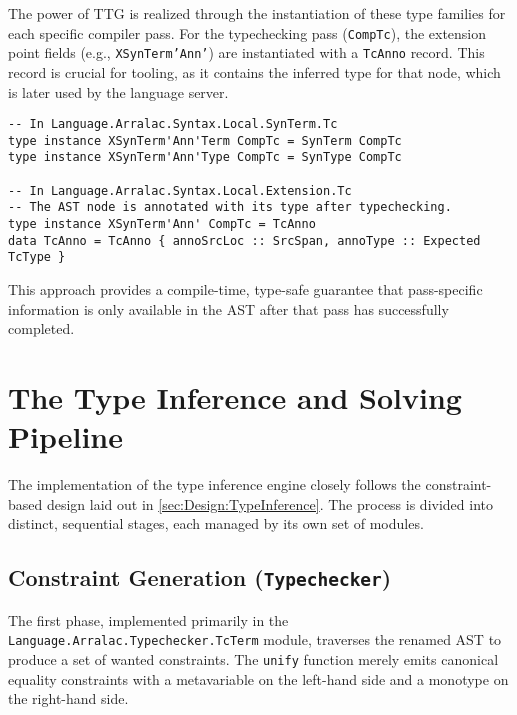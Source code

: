 The power of TTG is realized through the instantiation of these type families for each specific compiler pass. For the typechecking pass (\texttt{CompTc}), the extension point fields (e.g., \texttt{XSynTerm'Ann'}) are instantiated with a \texttt{TcAnno} record. This record is crucial for tooling, as it contains the inferred type for that node, which is later used by the language server.

\begin{verbatim}
-- In Language.Arralac.Syntax.Local.SynTerm.Tc
type instance XSynTerm'Ann'Term CompTc = SynTerm CompTc
type instance XSynTerm'Ann'Type CompTc = SynType CompTc

-- In Language.Arralac.Syntax.Local.Extension.Tc
-- The AST node is annotated with its type after typechecking.
type instance XSynTerm'Ann' CompTc = TcAnno
data TcAnno = TcAnno { annoSrcLoc :: SrcSpan, annoType :: Expected TcType }
\end{verbatim}

This approach provides a compile-time, type-safe guarantee that pass-specific information is only available in the AST after that pass has successfully completed.

\section{The Type Inference and Solving Pipeline}
\label{sec:Implementation:Pipeline}

The implementation of the type inference engine closely follows the constraint-based design laid out in \cref{sec:Design:TypeInference}. The process is divided into distinct, sequential stages, each managed by its own set of modules.

\subsection{Constraint Generation (\texttt{Typechecker})}
The first phase, implemented primarily in the \texttt{Language.Arralac.Typechecker.TcTerm} module, traverses the renamed AST to produce a set of wanted constraints. The \texttt{unify} function merely emits canonical equality constraints with a metavariable on the left-hand side and a monotype on the right-hand side.

